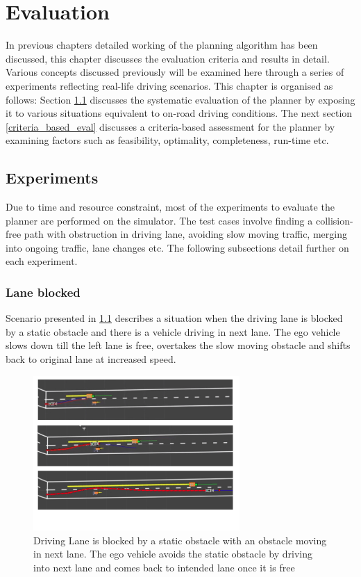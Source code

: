\chapter{Evaluation}
\label{evaluation}
In previous chapters detailed working of the planning algorithm has been discussed, this chapter discusses the evaluation criteria and results in detail. Various concepts discussed previously will be examined here through a series of experiments reflecting real-life driving scenarios. This chapter is organised as follows: Section \ref{experiments} discusses the systematic evaluation of the planner by exposing it to various situations equivalent to on-road driving conditions. The next section \ref{criteria_based_eval} discusses a criteria-based assessment for the planner by examining factors such as feasibility, optimality, completeness, run-time etc.

\section{Experiments}\label{experiments}
Due to time and resource constraint, most of the experiments to evaluate the planner are performed on the simulator. The test cases involve finding a collision-free path with obstruction in driving lane, avoiding slow moving traffic, merging into ongoing traffic, lane changes etc. The following subsections detail further on each experiment. 

\subsection{Lane blocked}
Scenario presented in \ref{lane_blocked_1} describes a situation when the driving lane is blocked by a static obstacle and there is a vehicle driving in next lane. The ego vehicle slows down till the left lane is free, overtakes the slow moving obstacle and shifts back to original lane at increased speed. 

\begin{figure}[h]
    \centering
    \includegraphics[width=0.7\textwidth]{Images/evaluation/2_lane_blocked.jpg}
    \caption{Driving Lane is blocked by a static obstacle with an obstacle moving in next lane. The ego vehicle avoids the static obstacle by driving into next lane and comes back to intended lane once it is free}
    \label{lane_blocked_1}
\end{figure}

